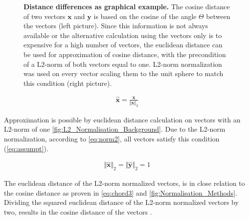 \begin{figure}[!hbt]
\begin{subfigure}[b]{0.475\textwidth}
    \end{subfigure}
    \caption[Distance differences as graphical example]{\textbf{Distance differences as graphical example.} The cosine distance of two vectors $\mathbf{x}$ and $\mathbf{y}$ is based on the cosine of the angle $\Theta$ between the vectors (left picture). Since this information is not always available or the alternative calculation using the vectors only is to expensive for a high number of vectors, the euclidean distance can be used for approximation of cosine distance, with the precondition of a L2-norm of both vectors equal to one. L2-norm normalization was used on every vector scaling them to the unit sphere to match this condition (right picture).}
    \label{fig:L2_Normalisation_Background}
\end{figure}

\begin{equation}\label{eq:norm2}
    \begin{aligned}
        \mathbf{\hat{x}} = \frac{\mathbf{x}}{\Vert\mathbf{x}\Vert_2}
    \end{aligned}
\end{equation}

\newpage
Approximation is possible by euclidean distance calculation on vectors with an L2-norm of one \autoref{fig:L2_Normalisation_Background}. Due to the L2-norm normalization, according to \autoref{eq:norm2}, all vectors satisfy this condition (\autoref{eq:assumpt}).

\begin{equation}\label{eq:assumpt}
    \begin{aligned}
        \Vert\mathbf{\hat{x}}\Vert_2 = \Vert\mathbf{\hat{y}}\Vert_2 = 1
    \end{aligned}
\end{equation}

The euclidean distance of the L2-norm normalized vectors, is in close relation to the cosine distance as proven in \autoref{eq:chord3} and \autoref{fig:Normalisation_Methods}. Dividing the squared euclidean distance of the L2-norm normalized vectors by two, results in the cosine distance of the vectors \autocite{korenius_principal_2007}.

